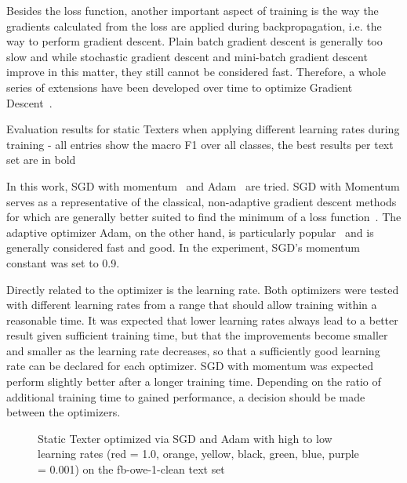 Besides the loss function, another important aspect of training is the way the gradients calculated from the loss are applied during backpropagation, i.e. the way to perform gradient descent. Plain batch gradient descent is generally too slow and while stochastic gradient descent and mini-batch gradient descent improve in this matter, they still cannot be considered fast. Therefore, a whole series of extensions have been developed over time to optimize Gradient Descent~\cite{Ruder2016AnOO}.

\begin{table}[t]
    \centering
    
    \caption{Evaluation results for static Texters when applying different learning rates during training - all entries show the macro F1 over all classes, the best results per text set are in bold}
    \label{tab:5_experiments/4_texter/2_static/8_optimizer/grid_search}
\end{table}

In this work, SGD with momentum~\cite{Qian1999OnTM} and Adam~\cite{Kingma2015AdamAM} are tried. SGD with Momentum serves as a representative of the classical, non-adaptive gradient descent methods for which are generally better suited to find the minimum of a loss function~\cite{Wilson2017TheMV}. The adaptive optimizer Adam, on the other hand, is particularly popular~\cite{AdamPopular} and is generally considered fast and good. In the experiment, SGD's momentum constant was set to 0.9.

Directly related to the optimizer is the learning rate. Both optimizers were tested with different learning rates from a range that should allow training within a reasonable time. It was expected that lower learning rates always lead to a better result given sufficient training time, but that the improvements become smaller and smaller as the learning rate decreases, so that a sufficiently good learning rate can be declared for each optimizer. SGD with momentum was expected perform slightly better after a longer training time. Depending on the ratio of additional training time to gained performance, a decision should be made between the optimizers.

\begin{figure}[t]
    \centering
    
    \caption{Static Texter optimized via SGD and Adam with high to low learning rates (red = 1.0, orange, yellow, black, green, blue, purple = 0.001) on the fb-owe-1-clean text set}
    \label{fig:5_experiments/4_texter/2_static/8_optimizer/sgd_vs_adam/sgd_vs_adam}
\end{figure}

